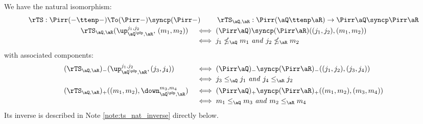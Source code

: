 \documentclass{article}
\begin{document}
\begin{theorem}
\label{thm:sync_is_tight_tensor}
\item
We have the natural isomorphism:
\[
\begin{tabular}{c}
$\rTS : \Pirr(- \ttenp -) \To (\Pirr - )\syncp (\Pirr -)$
\qquad
$\rTS_{\aQ,\aR} : \Pirr(\aQ \ttenp \aR) \to \Pirr \aQ \syncp \Pirr \aR$
\\[0.5ex]
\begin{tabular}{ll}
$\rTS_{\aQ,\aR}(\up_{\aQ^{\pOp},\aR}^{j_1,j_2},\,(m_1,m_2))$ &
$\iff (\Pirr \aQ) \syncp (\Pirr \aR)((j_1,j_2),(m_1,m_2))$
\\[0.5ex] &
$\iff j_1 \nleq_\aQ m_1 \text{ \emph{and} }  j_2 \nleq_\aR m_2$
\end{tabular}
\end{tabular}
\]
with associated components:
\[
\begin{tabular}{lll}
$(\rTS_{\aQ,\aR})_- (\up_{\aQ^{\pOp},\aR}^{j_1,j_2},(j_3,j_4))$ 
& $\iff  (\Pirr\aQ)_- \syncp (\Pirr\aR)_- ((j_1,j_2),(j_3,j_4))$
\\[0.5ex]
& $\iff  j_3 \leq_\aQ j_1 \text{ \emph{and} } j_4 \leq_\aR j_2$
\\[1ex]
$(\rTS_{\aQ,\aR})_+((m_1,m_2),\down_{\aQ^{\pOp},\aR}^{m_3,m_4}) $ 
& $\iff (\Pirr\aQ)_+ \syncp (\Pirr\aR)_+ ((m_1,m_2),(m_3,m_4))$
\\[0.5ex]&
$\iff m_1 \leq_\aQ m_3 \text{ \emph{and} } m_2 \leq_\aR m_4$
\end{tabular}
\]
Its inverse is described in Note \ref{note:ts_nat_inverse} directly below.
\end{theorem}
\end{document}
